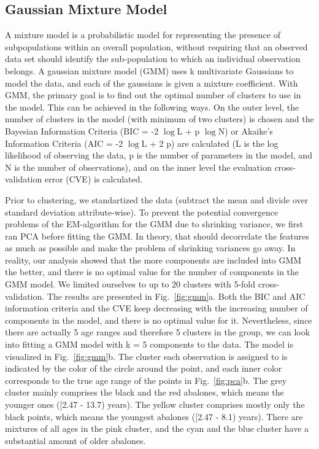 \documentclass[10pt, paper=a4]{article}
\begin{document}
\subsection{Gaussian Mixture Model}
A mixture model is a probabilistic model for representing the presence of
subpopulations within an overall population, without requiring that an observed
data set should identify the sub-population to which an individual observation
belongs.  A gaussian mixture model (GMM) uses k multivariate Gaussians to model
the data, and each of the gaussians is given a mixture coefficient.  With GMM,
the primary goal is to find out the optimal number of clusters to use in the
model.  This can be achieved in the following ways.  On the outer level, the
number of clusters in the model (with minimum of two clusters) is chosen and the
Bayesian Information Criteria (BIC = -2 $\log$L + p $\log$N) or Akaike's
Information Criteria (AIC = -2 $\log$L + 2 p) are calculated (L is the log
likelihood of observing the data, p is the number of parameters in the model,
and N is the number of observations), and on the inner level the evaluation
cross-validation error (CVE) is calculated.

Prior to clustering, we standartized the data (subtract the mean and divide over
standard deviation attribute-wise).  To prevent the potential convergence
problems of the EM-algorithm for the GMM due to shrinking variance, we first ran
PCA before fitting the GMM.  In theory, that should decorrelate the features as
much as possible and make the problem of shrinking variances go away.  In
reality, our analysis showed that the more components are included into GMM the
better, and there is no optimal value for the number of components in the GMM
model.  We limited ourselves to up to 20 clusters with 5-fold cross-validation.
The results are presented in Fig.~\ref{fig:gmm}a.  Both the BIC and AIC
information criteria and the CVE keep decreasing with the increasing number of
components in the model, and there is no optimal value for it.  Nevertheless,
since there are actually 5 age ranges and therefore 5 clusters in the group, we
can look into fitting a GMM model with k = 5 components to the data.  The model
is visualized in Fig.~\ref{fig:gmm}b.  The cluster each observation is assigned
to is indicated by the color of the circle around the point, and each inner
color corresponds to the true age range of the points in Fig.~\ref{fig:pca}b.
The grey cluster mainly comprises the black and the red abalones, which means
the younger ones ([2.47 - 13.7) years).  The yellow cluster comprises mostly
  only the black points, which means the youngest abalones ([2.47 - 8.1) years).
    There are mixtures of all ages in the pink cluster, and the cyan and the
    blue cluster have a substantial amount of older abalones.
\end{document}
